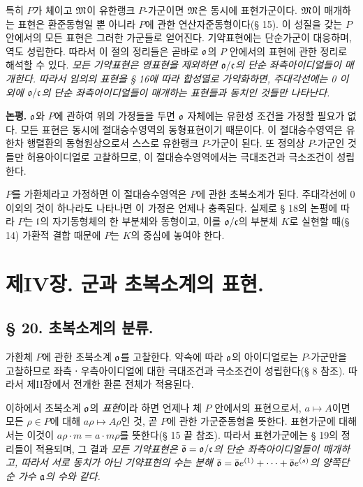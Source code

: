 특히 \(P\)가 체이고 \(\mathfrak M\)이 유한랭크 \(P\)-가군이면 \(\mathfrak M\)은 동시에 표현가군이다. \(\mathfrak M\)이 매개하는 표현은 환준동형일 뿐 아니라 \(P\)에 관한 연산자준동형이다(§ 15). 이 성질을 갖는 \(P\) 안에서의 모든 표현은 그러한 가군들로 얻어진다. 기약표현에는 단순가군이 대응하며, 역도 성립한다. 따라서 이 절의 정리들은 곧바로 \(\mathfrak o\)의 \(P\) 안에서의 표현에 관한 정리로 해석할 수 있다. \emph{모든 기약표현은 영표현을 제외하면 \(\mathfrak o/\mathfrak c\)의 단순 좌측아이디얼들이 매개한다. 따라서 임의의 표현을 § 16에 따라 합성열로 가약화하면, 주대각선에는 0 이외에 \(\mathfrak o/\mathfrak c\)의 단순 좌측아이디얼들이 매개하는 표현들과 동치인 것들만 나타난다.}

\textbf{논평.} \(\mathfrak o\)와 \(P\)에 관하여 위의 가정들을 두면 \(\mathfrak o\) 자체에는 유한성 조건을 가정할 필요가 없다. 모든 표현은 동시에 절대승수영역의 동형표현이기 때문이다. 이 절대승수영역은 유한차 행렬환의 동형원상으로서 스스로 유한랭크 \(P\)-가군이 된다. 또 정의상 \(P\)-가군인 것들만 허용아이디얼로 고찰하므로, 이 절대승수영역에서는 극대조건과 극소조건이 성립한다.

\(P\)를 가환체라고 가정하면 이 절대승수영역은 \(P\)에 관한 초복소계가 된다. 주대각선에 0 이외의 것이 하나라도 나타나면 이 가정은 언제나 충족된다. 실제로 § 18의 논평에 따라 \(P\)는 \(\mathfrak l\)의 자기동형체의 한 부분체와 동형이고, 이를 \(\mathfrak o/\mathfrak c\)의 부분체 \(K\)로 실현할 때(§ 14) 가환적 결합 때문에 \(P\)는 \(K\)의 중심에 놓여야 한다.

\section*{제IV장. 군과 초복소계의 표현.}

\subsection*{§ 20. 초복소계의 분류.}

가환체 \(P\)에 관한 초복소계 \(\mathfrak o\)를 고찰한다. 약속에 따라 \(\mathfrak o\)의 아이디얼로는 \(P\)-가군만을 고찰하므로 좌측ㆍ우측아이디얼에 대한 극대조건과 극소조건이 성립한다(§ 8 참조). 따라서 제II장에서 전개한 환론 전체가 적용된다.

이하에서 초복소계 \(\mathfrak o\)의 \emph{표현}이라 하면 언제나 체 \(P\) 안에서의 표현으로서, \(a\mapsto A\)이면 모든 \(\rho\in P\)에 대해 \(a\rho\mapsto A\rho\)인 것, 곧 \(P\)에 관한 가군준동형을 뜻한다. 표현가군에 대해서는 이것이 \(a\rho\cdot m=a\cdot m\rho\)를 뜻한다(§ 15 끝 참조). 따라서 표현가군에는 § 19의 정리들이 적용되며, 그 결과 \emph{모든 기약표현은 \(\bar{\mathfrak o}=\mathfrak o/\mathfrak c\)의 단순 좌측아이디얼들이 매개하고, 따라서 서로 동치가 아닌 기약표현의 수는 분해 \(\bar{\mathfrak o}=\bar{\mathfrak o}e^{(1)}+\cdots+\bar{\mathfrak o}e^{(s)}\)의 양쪽단순 가수 \(\mathfrak{a}\)의 수와 같다.}

